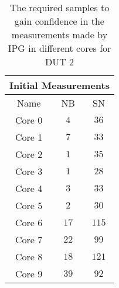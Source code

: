 \begin{table}[H]
    \centering
    \begin{tabular}{|| c | c | c ||}
    \hline
    \multicolumn{3}{||c||}{Initial Measurements} \\ [0.5ex] \hline\hline
    Name & NB & SN \\\hline
    Core 0 & $4$ & $36$ \\
    Core 1 & $7$ & $33$ \\
    Core 2 & $1$ & $35$ \\
    Core 3 & $1$ & $28$ \\
    Core 4 & $3$ & $33$ \\
    Core 5 & $2$ & $30$ \\
    Core 6 & $17$ & $115$ \\
    Core 7 & $22$ & $99$ \\
    Core 8 & $18$ & $121$ \\
    Core 9 & $39$ & $92$ \\\hline
    \end{tabular}
    \caption{The required samples to gain confidence in the measurements made by IPG in different cores for DUT 2}
    \label{tab:initial-measurements-exp-3-dut-2}
\end{table}